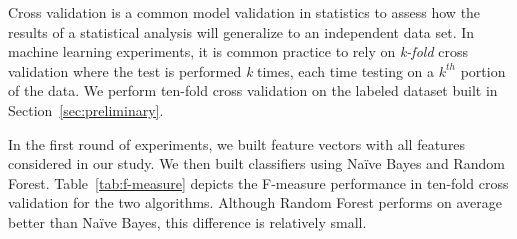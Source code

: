 Cross validation is a common model validation in statistics to
assess how the results of a statistical analysis will generalize to an
independent data set. In machine learning experiments, it is common practice to
rely on {\it k-fold} cross validation where the test is performed {\it k} times,
each time testing on a $k^{th}$ portion of the data. We perform ten-fold cross
validation on the labeled dataset built in Section~\ref{sec:preliminary}.

In the first round of experiments, we built feature vectors with all
features considered in our study. We then built classifiers using Na\"{i}ve
Bayes and Random Forest. Table~\ref{tab:f-measure} depicts the F-measure
performance in ten-fold cross validation for the two algorithms. Although
Random Forest performs on average better than Na\"{i}ve Bayes, this difference
is relatively small.








